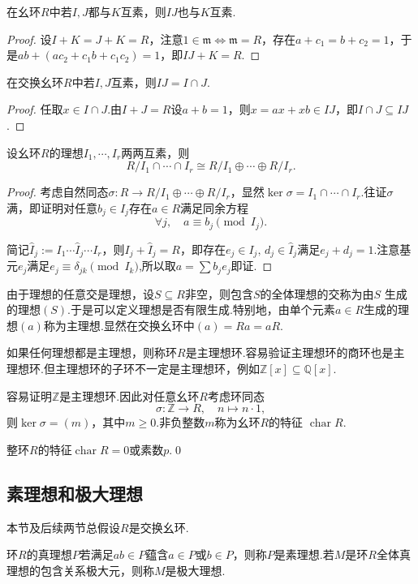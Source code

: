 \begin{prop}
    在幺环$R$中若$I,J$都与$K$互素，则$IJ$也与$K$互素.
\end{prop}
\begin{proof}
    设$I+K=J+K=R$，注意$1\in\mathfrak{m}\Leftrightarrow\mathfrak{m}=R$，存在$a+c_1=b+c_2=1$，于是$ab+(ac_2+c_1b+c_1c_2)=1$，即$IJ+K=R$.
\end{proof}
\begin{prop}
    在交换幺环$R$中若$I,J$互素，则$IJ=I\cap J$.
\end{prop}
\begin{proof}
    任取$x\in I\cap J$.由$I+J=R$设$a+b=1$，则$x=ax+xb\in IJ$，即$I\cap J\subseteq IJ$.
\end{proof}
\begin{thm}[(中国剩余定理)]
    设幺环$R$的理想$I_1,\cdots,I_r$两两互素，则
    \[
        R/I_1\cap\cdots\cap I_r\cong R/I_1\oplus\cdots\oplus R/I_r.
    \]
\end{thm}
\begin{proof}
    考虑自然同态$\sigma\colon R\to R/I_1\oplus\cdots\oplus R/I_r$，显然$\ker\sigma=I_1\cap\cdots\cap I_r$.往证$\sigma$满，即证明对任意$b_j\in I_j$存在$a\in R$满足同余方程
    \[
        \forall j,\quad a\equiv b_j\pmod{I_j}.
    \]

    简记$\hat I_j:=I_1\cdots\hat{I}_j\cdots I_r$，则$I_j+\hat I_j=R$，即存在$e_j\in I_j,\,d_j\in\hat I_j$满足$e_j+d_j=1$.注意基元$e_j$满足$e_j\equiv \delta_{jk}\pmod{I_k}$,所以取$a=\sum b_je_j$即证.
\end{proof}

由于理想的任意交是理想，设$S\subseteq R$非空，则包含$S$的全体理想的交称为由$S$ {\heiti 生成}的理想$(S)$.于是可以定义理想是否{\heiti 有限生成}.特别地，由单个元素$a\in R$生成的理想$(a)$称为{\heiti 主理想}.显然在交换幺环中$(a)=Ra=aR$.

如果任何理想都是主理想，则称环$R$是{\heiti 主理想环}.容易验证主理想环的商环也是主理想环.但主理想环的子环不一定是主理想环，例如$\mathbb{Z}[x]\subseteq\mathbb{Q}[x]$.

容易证明$\mathbb{Z}$是主理想环.因此对任意幺环$R$考虑环同态
\[
    \sigma\colon \mathbb{Z}\to R,\quad n\mapsto n\cdot 1,
\]
则$\ker\sigma=(m)$，其中$m\ge 0$.非负整数$m$称为幺环$R$的{\heiti 特征} $\operatorname*{char} R$.
\begin{prop}
    整环$R$的特征$\operatorname*{char} R=0$或素数$p$.\qed
\end{prop}

\subsection{素理想和极大理想}
{\heiti 本节及后续两节总假设$R$是交换幺环}.
\begin{definition}
    环$R$的真理想$P$若满足$ab\in P$蕴含$a\in P$或$b\in P$，则称$P$是{\heiti 素理想}.若$M$是环$R$全体真理想的包含关系极大元，则称$M$是{\heiti 极大理想}.
\end{definition}

